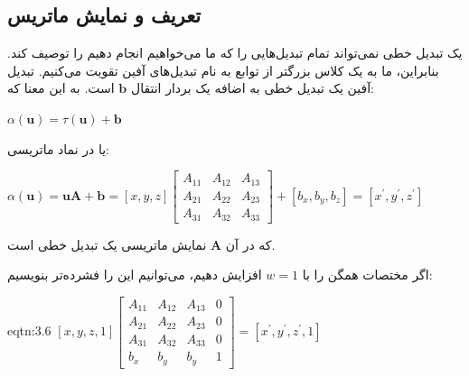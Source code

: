 \subsection{\textbf{تعریف و نمایش ماتریس}}
\label{subsec:3.2.2}
{
    \Large
    \begin{spacing}{1.5}
        یک تبدیل خطی نمی‌تواند تمام تبدیل‌هایی را که ما می‌خواهیم انجام دهیم را توصیف کند.
        بنابراین، ما به یک کلاس بزرگتر از توابع به نام تبدیل‌های آفین تقویت می‌کنیم.
        تبدیل آفین یک تبدیل خطی به اضافه یک بردار انتقال $\textbf{b}$ است. به این معنا که:

        \begin{center}
            $\alpha(\textbf{u})=\tau(\textbf{u})+\textbf{b}$
        \end{center}

        یا در نماد ماتریسی:

        \begin{center}
            $\alpha(\textbf{u})=\textbf{uA}+\textbf{b}=[x, y, z]\begin{bmatrix}
                                                                    A_{11} & A_{12} & A_{13} \\
                                                                    A_{21} & A_{22} & A_{23} \\
                                                                    A_{31} & A_{32} & A_{33}
            \end{bmatrix}+[b_{x},b_{y},b_{z}]=[x^\prime,y^\prime,z^\prime]$
        \end{center}

        که در آن $\textbf{A}$ نمایش ماتریسی یک تبدیل خطی است.

        اگر مختصات همگن را با $w=1$ افزایش دهیم، می‌توانیم این را فشرده‌تر بنویسیم:

        \begin{eqtn}{eqtn:3.6}
            \centering
            $[x, y, z, 1]\begin{bmatrix}
                             A_{11} & A_{12} & A_{13} & 0 \\
                             A_{21} & A_{22} & A_{23} & 0 \\
                             A_{31} & A_{32} & A_{33} & 0 \\
                             b_{x}  & b_{y}  & b_{y}  & 1
            \end{bmatrix}=[x^\prime, y^\prime, z^\prime,1]$
        \end{eqtn}


\end{spacing}}
